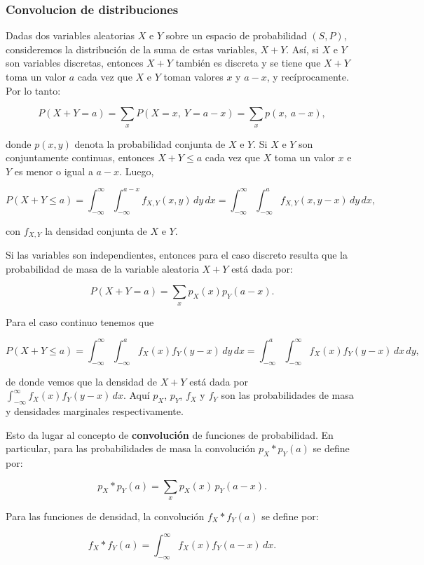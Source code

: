 \documentclass[11pt, a4paper]{article}
\theoremstyle{definition}
\begin{document}
\subsubsection{Convolucion de distribuciones }

Dadas dos variables aleatorias \(X\) e \(Y\) sobre un espacio de probabilidad \((S,P)\), consideremos la distribución de la suma de estas variables, \(X+Y\). Así, si \(X\) e \(Y\) son variables discretas, entonces \(X+Y\) también es discreta y se tiene que \(X+Y\) toma un valor \(a\) cada vez que \(X\) e \(Y\) toman valores \(x\) y \(a-x\), y recíprocamente. Por lo tanto:

\[P(X+Y=a)=\sum_{x}P(X=x,\ Y=a-x)=\sum_{x}p(x,\ a-x),\]

donde \(p(x,y)\) denota la probabilidad conjunta de \(X\) e \(Y\). Si \(X\) e \(Y\) son conjuntamente continuas, entonces \(X+Y\leq a\) cada vez que \(X\) toma un valor \(x\) e \(Y\) es menor o igual a \(a-x\). Luego,

\[P(X+Y\leq a)=\int_{-\infty}^{\infty}\int_{-\infty}^{a-x}f_{X,Y}(x,y)\,dy\,dx=\int_{-\infty}^{\infty}\int_{-\infty}^{a}f_{X,Y}(x,y-x)\,dy\,dx,\]

con \(f_{X,Y}\) la densidad conjunta de \(X\) e \(Y\).

Si las variables son independientes, entonces para el caso discreto resulta que la probabilidad de masa de la variable aleatoria \(X+Y\) está dada por:

\[P(X+Y=a)=\sum_{x}p_{X}(x)p_{Y}(a-x).\]

Para el caso continuo tenemos que

\[P(X+Y\leq a)=\int_{-\infty}^{\infty}\int_{-\infty}^{a}f_{X}(x)f_{Y}(y-x)\,dy\,dx=\int_{-\infty}^{a}\int_{-\infty}^{\infty}f_{X}(x)f_{Y}(y-x)\,dx\,dy,\]

de donde vemos que la densidad de \(X+Y\) está dada por \(\int_{-\infty}^{\infty}f_{X}(x)f_{Y}(y-x)\,dx\). Aquí \(p_{X}\), \(p_{Y}\), \(f_{X}\) y \(f_{Y}\) son las probabilidades de masa y densidades marginales respectivamente.

Esto da lugar al concepto de \textbf{convolución} de funciones de probabilidad. En particular, para las probabilidades de masa la convolución \(p_{X}*p_{Y}(a)\) se define por:

\[p_{X}*p_{Y}(a)=\sum_{x}p_{X}(x)\,p_{Y}(a-x).\]

Para las funciones de densidad, la convolución \(f_{X}*f_{Y}(a)\) se define por:

\[f_{X}*f_{Y}(a)=\int_{-\infty}^{\infty}f_{X}(x)f_{Y}(a-x)\,dx.\]
\end{document}
